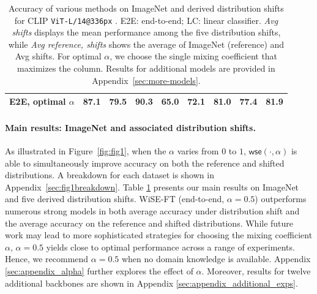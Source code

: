 \begin{table}
\begin{center}
\begin{tabular}{lc|ccccc|cc}
\quad \quad E2E, optimal $\alpha$       &  \textbf{87.1} &  \textbf{79.5} &  \textbf{90.3} &  \textbf{65.0} &  \textbf{72.1} &  \textbf{81.0} & \textbf{77.4} &  \textbf{81.9} \\


\bottomrule
\end{tabular}
\caption{\label{tab:main} Accuracy of various methods on ImageNet and derived distribution shifts for CLIP \texttt{ViT-L/14@336px} \cite{radford2021learning}. E2E: end-to-end; LC: linear classifier. \textit{Avg shifts} displays the mean performance among the five distribution shifts, while \textit{Avg reference, shifts} shows the average of ImageNet (reference) and Avg shifts. For optimal $\alpha$, we choose the single mixing coefficient that maximizes the column. Results for additional models are provided in Appendix~\ref{sec:more-models}.
}

\end{center}
\end{table}









\paragraph{Main results: ImageNet and associated distribution shifts.}
\label{sec:main_results}
As illustrated in Figure~\ref{fig:fig1}, when the \ALPHA{} $\alpha$ varies from $0$ to $1$, $\mathsf{wse}(\cdot, \alpha)$ is able to simultaneously improve accuracy on both the reference and shifted distributions. A breakdown for each dataset is shown in Appendix~\ref{sec:fig1breakdown}. 
Table \ref{tab:main} presents our main results on ImageNet and five derived distribution shifts. 
WiSE-FT (end-to-end, $\alpha{=}0.5$) outperforms numerous strong models in both average accuracy under distribution shift and the average accuracy on the reference and shifted distributions.
While future work may lead to more sophisticated strategies for choosing the mixing coefficient $\alpha$, $\alpha{=}0.5$ yields close to optimal performance across a range of experiments. Hence, we recommend $\alpha{=}0.5$ when no domain knowledge is available. Appendix \ref{sec:appendix_alpha} further explores the effect of $\alpha$. Moreover, results for twelve additional backbones are shown in Appendix \ref{sec:appendix_additional_exps}. 


